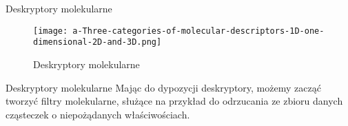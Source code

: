 \documentclass{beamer}
\begin{document}
\begin{frame}{Deskryptory molekularne}
\begin{figure}[H]
    \centering
    \texttt{[image: a-Three-categories-of-molecular-descriptors-1D-one-dimensional-2D-and-3D.png]}
    \caption{Deskryptory molekularne\cite{descriptors_image}}
    \label{fig:enter-label}
\end{figure}
\end{frame}

\begin{frame}{Deskryptory molekularne}
Mając do dypozycji deskryptory, możemy zacząć tworzyć filtry molekularne, służące na przykład do odrzucania ze zbioru danych cząsteczek o niepożądanych właściwościach.
\end{frame}



\end{document}
